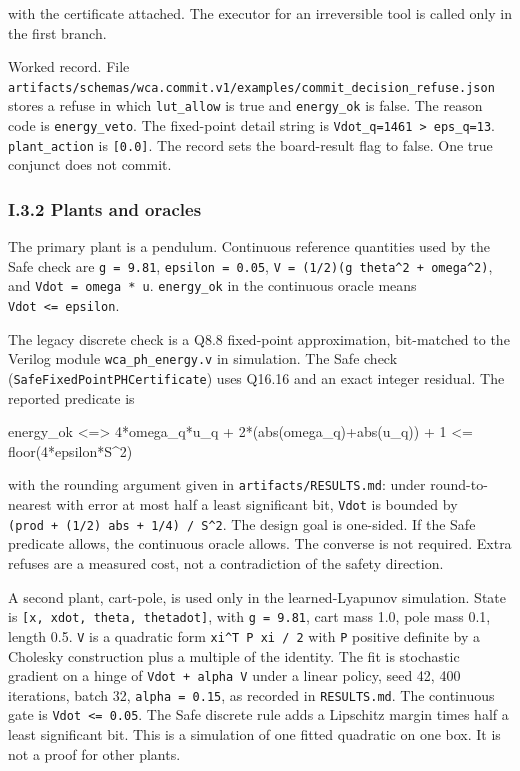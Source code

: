 \documentclass[
  10pt,
]{article}
\newenvironment{Shaded}{}{}
\newcommand{\NormalTok}[1]{#1}
\begin{document}
with the certificate attached. The executor for an irreversible tool is
called only in the first branch.

Worked record. File
\texttt{artifacts/schemas/wca.commit.v1/examples/commit\_decision\_refuse.json}
stores a refuse in which \texttt{lut\_allow} is true and
\texttt{energy\_ok} is false. The reason code is \texttt{energy\_veto}.
The fixed-point detail string is
\texttt{Vdot\_q=1461\ \textgreater{}\ eps\_q=13}. \texttt{plant\_action}
is \texttt{{[}0.0{]}}. The record sets the board-result flag to false.
One true conjunct does not commit.

\subsubsection{I.3.2 Plants and oracles}\label{i.3.2-plants-and-oracles}

The primary plant is a pendulum. Continuous reference quantities used by
the Safe check are \texttt{g\ =\ 9.81}, \texttt{epsilon\ =\ 0.05},
\texttt{V\ =\ (1/2)(g\ theta\^{}2\ +\ omega\^{}2)}, and
\texttt{Vdot\ =\ omega\ *\ u}. \texttt{energy\_ok} in the continuous
oracle means \texttt{Vdot\ \textless{}=\ epsilon}.

The legacy discrete check is a Q8.8 fixed-point approximation,
bit-matched to the Verilog module \texttt{wca\_ph\_energy.v} in
simulation. The Safe check (\texttt{SafeFixedPointPHCertificate}) uses
Q16.16 and an exact integer residual. The reported predicate is

\begin{Shaded}
\begin{Highlighting}[]
\NormalTok{energy\_ok \textless{}=\textgreater{} 4*omega\_q*u\_q + 2*(abs(omega\_q)+abs(u\_q)) + 1}
\NormalTok{              \textless{}= floor(4*epsilon*S\^{}2)}
\end{Highlighting}
\end{Shaded}

with the rounding argument given in \texttt{artifacts/RESULTS.md}: under
round-to-nearest with error at most half a least significant bit,
\texttt{Vdot} is bounded by
\texttt{(prod\ +\ (1/2)\ abs\ +\ 1/4)\ /\ S\^{}2}. The design goal is
one-sided. If the Safe predicate allows, the continuous oracle allows.
The converse is not required. Extra refuses are a measured cost, not a
contradiction of the safety direction.

A second plant, cart-pole, is used only in the learned-Lyapunov
simulation. State is \texttt{{[}x,\ xdot,\ theta,\ thetadot{]}}, with
\texttt{g\ =\ 9.81}, cart mass 1.0, pole mass 0.1, length 0.5.
\texttt{V} is a quadratic form \texttt{xi\^{}T\ P\ xi\ /\ 2} with
\texttt{P} positive definite by a Cholesky construction plus a multiple
of the identity. The fit is stochastic gradient on a hinge of
\texttt{Vdot\ +\ alpha\ V} under a linear policy, seed 42, 400
iterations, batch 32, \texttt{alpha\ =\ 0.15}, as recorded in
\texttt{RESULTS.md}. The continuous gate is
\texttt{Vdot\ \textless{}=\ 0.05}. The Safe discrete rule adds a
Lipschitz margin times half a least significant bit. This is a
simulation of one fitted quadratic on one box. It is not a proof for
other plants.
\end{document}
